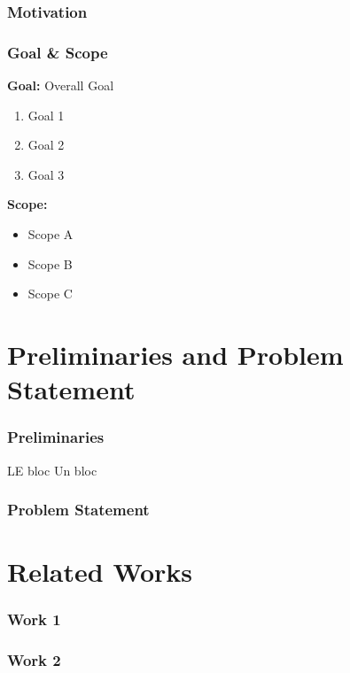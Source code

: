 \documentclass{article}
\begin{document}
\begin{frame}
\frametitle{Motivation}

\end{frame}

\begin{frame}
\frametitle{Goal \& Scope}
\textbf{Goal:} Overall Goal
\begin{enumerate}
    \item Goal 1
    \item Goal 2
    \item Goal 3
\end{enumerate}
\vspace{0.5cm}
\pause
\textbf{Scope:}
\begin{itemize}
    \item Scope A
    \item Scope B
    \item Scope C
\end{itemize}
\end{frame}

\section{Preliminaries and Problem Statement}
\begin{frame}
\frametitle{Preliminaries}
\begin{block}{LE bloc} %
    Un bloc
\end{block}
\end{frame}

\begin{frame}
\frametitle{Problem Statement}

\end{frame}

\section{Related Works}
\begin{frame}
\frametitle{Work 1}

\end{frame}

\begin{frame}
\frametitle{Work 2}

\end{frame}
\end{document}
